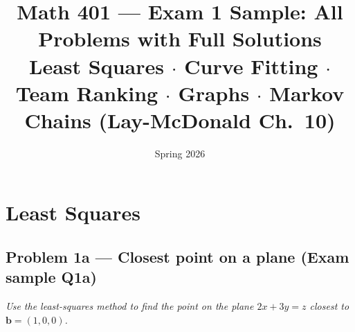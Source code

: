 \documentclass[11pt,a4paper]{article}
\title{\textbf{Math 401 --- Exam 1 Sample: All Problems with Full Solutions}\\[0.4em]
\normalsize Least Squares $\cdot$ Curve Fitting $\cdot$ Team Ranking $\cdot$
Graphs $\cdot$ Markov Chains (Lay-McDonald Ch.~10)}
\date{Spring 2026}
\author{}
\theoremstyle{sol}
\begin{document}
\maketitle
\tableofcontents
\clearpage

\section{Least Squares}

\subsection*{Problem 1a --- Closest point on a plane (Exam sample Q1a)}
\textit{Use the least-squares method to find the point on the plane $2x+3y=z$ closest to $\mathbf{b}=(1,0,0)$.}
\end{document}
